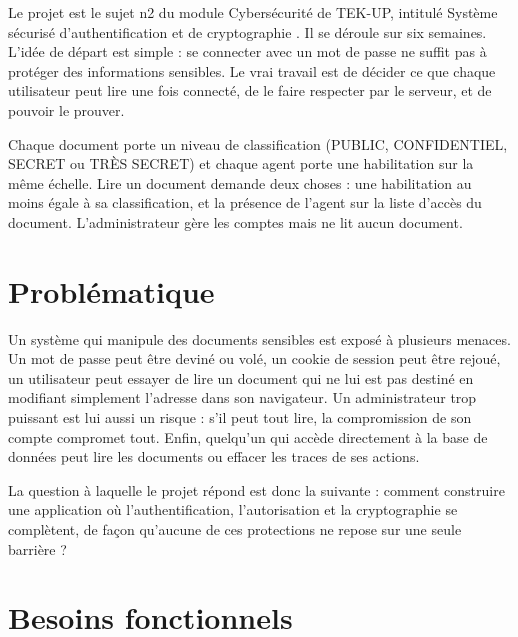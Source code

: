 \documentclass[12pt,a4paper]{report}
\begin{document}
Le projet est le sujet n\textdegree{}2 du module Cybersécurité de TEK-UP, intitulé \og Système sécurisé d'authentification et de cryptographie \fg. Il se déroule sur six semaines. L'idée de départ est simple : se connecter avec un mot de passe ne suffit pas à protéger des informations sensibles. Le vrai travail est de décider ce que chaque utilisateur peut lire une fois connecté, de le faire respecter par le serveur, et de pouvoir le prouver.

Chaque document porte un niveau de classification (PUBLIC, CONFIDENTIEL, SECRET ou TRÈS SECRET) et chaque agent porte une habilitation sur la même échelle. Lire un document demande deux choses : une habilitation au moins égale à sa classification, et la présence de l'agent sur la liste d'accès du document. L'administrateur gère les comptes mais ne lit aucun document.

\section{Problématique}

Un système qui manipule des documents sensibles est exposé à plusieurs menaces. Un mot de passe peut être deviné ou volé, un cookie de session peut être rejoué, un utilisateur peut essayer de lire un document qui ne lui est pas destiné en modifiant simplement l'adresse dans son navigateur. Un administrateur trop puissant est lui aussi un risque : s'il peut tout lire, la compromission de son compte compromet tout. Enfin, quelqu'un qui accède directement à la base de données peut lire les documents ou effacer les traces de ses actions.

La question à laquelle le projet répond est donc la suivante : comment construire une application où l'authentification, l'autorisation et la cryptographie se complètent, de façon qu'aucune de ces protections ne repose sur une seule barrière ?

\section{Besoins fonctionnels}
\end{document}
